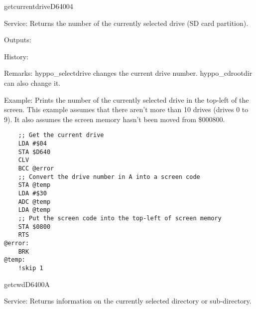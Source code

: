 \newpage
\begin{hyppotrap}{getcurrentdrive}{D640}{04}
\item [Service:]
  Returns the number of the currently selected drive (SD card partition).
\item [Outputs:]
\item [History:]
\item [Remarks:]
  hyppo\_selectdrive changes the current drive number. hyppo\_cdrootdir
  can also change it.
\item [Example:]
  Prints the number of the currently selected drive in the top-left of the
  screen. This example assumes that there aren't more than 10 drives (drives
  0 to 9). It also assumes the screen memory hasn't been moved from \$000800.
\begin{tcolorbox}[colback=black,coltext=white]
\verbatimfont{\codefont}
\begin{verbatim}
    ;; Get the current drive
    LDA #$04
    STA $D640
    CLV
    BCC @error
    ;; Convert the drive number in A into a screen code
    STA @temp
    LDA #$30
    ADC @temp
    LDA @temp
    ;; Put the screen code into the top-left of screen memory
    STA $0800
    RTS
@error:
    BRK
@temp:
    !skip 1
\end{verbatim}
\end{tcolorbox}
\end{hyppotrap}


\newpage
\begin{hyppotrap}{getcwd}{D640}{0A}
\item [Service:]
  Returns information on the currently selected directory or sub-directory.
\notimplemented
\end{hyppotrap}


